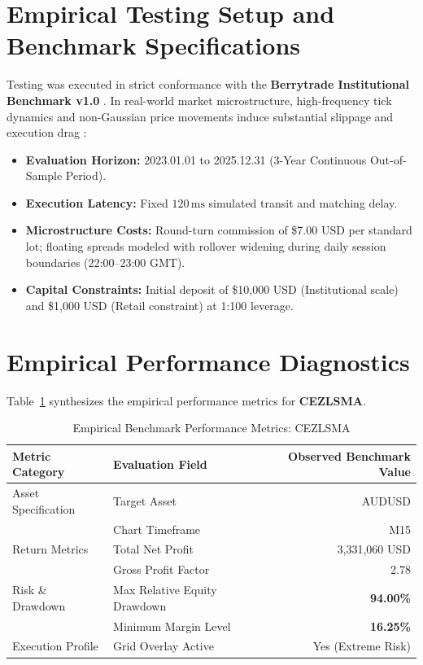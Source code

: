 \documentclass[11pt,a4paper]{article}
\begin{document}
\section{Empirical Testing Setup and Benchmark Specifications}
Testing was executed in strict conformance with the \textbf{Berrytrade Institutional Benchmark v1.0} \cite{artsu2026illusion}. In real-world market microstructure, high-frequency tick dynamics and non-Gaussian price movements induce substantial slippage and execution drag \cite{kyle1985continuous, amihud2002illiquidity, cont2001empirical, mandelbrot1963variation}:
\begin{itemize}
    \item \textbf{Evaluation Horizon:} 2023.01.01 to 2025.12.31 (3-Year Continuous Out-of-Sample Period).
    \item \textbf{Execution Latency:} Fixed $120\,\text{ms}$ simulated transit and matching delay.
    \item \textbf{Microstructure Costs:} Round-turn commission of \$7.00 USD per standard lot; floating spreads modeled with rollover widening during daily session boundaries (22:00--23:00 GMT).
    \item \textbf{Capital Constraints:} Initial deposit of \$10,000 USD (Institutional scale) and \$1,000 USD (Retail constraint) at 1:100 leverage.
\end{itemize}

\section{Empirical Performance Diagnostics}
Table~\ref{tab:metrics} synthesizes the empirical performance metrics for \textbf{CEZLSMA}.

\begin{table}[H]
\centering
\caption{Empirical Benchmark Performance Metrics: CEZLSMA}
\label{tab:metrics}
\begin{tabular}{llr}
\toprule
\textbf{Metric Category} & \textbf{Evaluation Field} & \textbf{Observed Benchmark Value} \\
\midrule
Asset Specification & Target Asset & AUDUSD \\
& Chart Timeframe & M15 \\
Return Metrics & Total Net Profit & 3,331,060 USD \\
& Gross Profit Factor & 2.78 \\
Risk \& Drawdown & Max Relative Equity Drawdown & \textbf{94.00\%} \\
& Minimum Margin Level & \textbf{16.25\%} \\
Execution Profile & Grid Overlay Active & Yes (Extreme Risk) \\
\bottomrule
\end{tabular}
\end{table}
\end{document}
